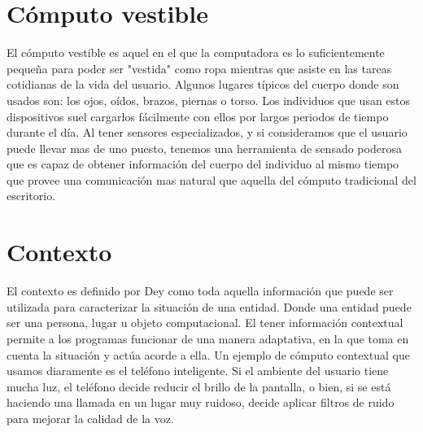 \documentclass[letterpaper,12pt]{cicese}
\begin{document}
			\section{C\'omputo vestible}
				El c\'omputo vestible es aquel en el que la computadora es lo suficientemente peque\~na para poder ser "vestida" como ropa mientras que asiste en las
				tareas cotidianas de la vida del usuario\citep{Starner97augmentedreality}. Algunos lugares t\'ipicos del cuerpo donde son usados son: los ojos, o\'idos, brazos, piernas o torso.
				Los individuos que usan estos dispositivos suel cargarlos f\'acilmente con ellos por largos periodos de tiempo durante el d\'ia. Al tener sensores
				especializados, y si consideramos que el usuario puede llevar mas de uno puesto, tenemos una herramienta de sensado poderosa que es capaz de obtener
				informaci\'on del cuerpo del individuo al mismo tiempo que provee una comunicaci\'on mas natural que aquella del c\'omputo tradicional del escritorio.

			\section{Contexto}
				El contexto es definido por Dey \citep{Dey2001} como toda aquella informaci\'on que puede ser utilizada para caracterizar la situaci\'on de una entidad. Donde una
				entidad puede ser una persona, lugar u objeto computacional. El tener informaci\'on contextual permite a los programas funcionar de una manera adaptativa,
				en la que toma en cuenta la situaci\'on y act\'ua acorde a ella. Un ejemplo de c\'omputo contextual que usamos diaramente es el tel\'efono inteligente.
				Si el ambiente del usuario tiene mucha luz, el tel\'efono decide reducir el brillo de la pantalla, o bien, si se est\'a haciendo una llamada en un lugar muy ruidoso,
				decide aplicar filtros de ruido para mejorar la calidad de la voz.
		
\end{document}
